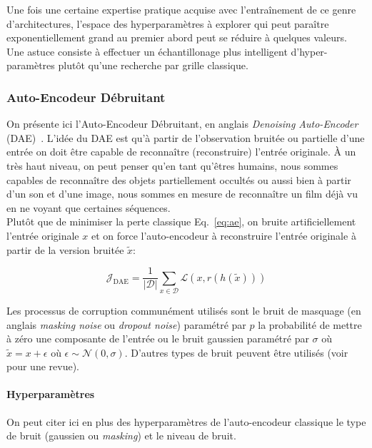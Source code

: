 Une fois une certaine expertise pratique acquise avec l'entraînement de ce
genre d'architectures, l'espace des hyperparamètres à explorer qui peut
paraître exponentiellement grand au premier abord peut se réduire à quelques
valeurs.  Une astuce consiste à effectuer un échantillonage plus intelligent
d'hyper-paramètres \citep{rnn14} plutôt qu'une recherche par grille classique.

\subsubsection{Auto-Encodeur Débruitant}

On présente ici l'Auto-Encodeur Débruitant, en anglais \textit{Denoising
Auto-Encoder} (DAE)~\citep{VincentPLarochelleH2008}.  L'idée du DAE est qu'à partir de l'observation bruitée ou partielle
d'une entrée on doit être capable de reconnaître (reconstruire) l'entrée
originale. À un très haut niveau, on peut penser qu'en tant qu'êtres humains,
nous sommes capables de reconnaître des objets partiellement occultés ou aussi
bien à partir d'un son et d'une image, nous sommes en mesure de reconnaître un
film déjà vu en ne voyant que certaines séquences.  \\

Plutôt que de minimiser la perte classique Eq.~\ref{eq:ae}, on bruite artificiellement l'entrée originale
$x$ et on force l'auto-encodeur à reconstruire l'entrée originale à partir de
la version bruitée $\tilde{x}$:

\begin{equation}
\mathcal{J}_{\textrm{DAE}} = \frac{1}{\vert \mathcal{D}\vert}\sum_{x\in\mathcal{D}}\mathcal{L}(x,r(h(\tilde{x})))
\label{eq:dae}
\end{equation}

Les processus de corruption communément utilisés sont le bruit de masquage (en anglais \textit{masking noise} ou 
\textit{dropout noise})
paramétré par $p$ la probabilité de mettre à zéro une composante de l'entrée ou
le bruit gaussien paramétré par $\sigma$ où $\tilde{x} = x + \epsilon$ où
$\epsilon \sim \mathcal{N}(0,\sigma)$. D'autres types de bruit
peuvent être utilisés (voir \cite{Vincent-JMLR-2010} pour une revue).

\paragraph{Hyperparamètres} On peut citer ici en plus des hyperparamètres de
l'auto-encodeur classique le type de bruit (gaussien ou \textit{masking}) et le niveau
de bruit.


